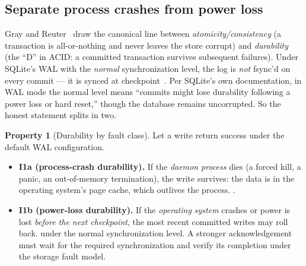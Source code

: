 \documentclass[11pt,a4paper]{article}
\theoremstyle{definition}
\newtheorem{property}{Property}[section]
\theoremstyle{remark}
\begin{document}
\subsection{Separate process crashes from power loss}
Gray and Reuter~ draw the canonical line between
\emph{atomicity/consistency} (a transaction is all-or-nothing and never leaves the
store corrupt) and \emph{durability} (the ``D'' in ACID: a committed transaction
survives subsequent failures). Under SQLite's WAL with the \emph{normal}
synchronization level, the log is \emph{not} fsync'd on every commit --- it is
synced at checkpoint~. Per SQLite's own documentation, in WAL mode
the normal level means ``commits might lose durability following a power loss or
hard reset,'' though the database remains uncorrupted. So the honest statement
splits in two.
\begin{property}[Durability by fault class]\label{prop:durability}
\setlength{\parskip}{4pt plus 1pt}
Let a write return success under the default WAL configuration.
\begin{itemize}[leftmargin=1.4em]
  \item \textbf{I1a (process-crash durability).} If the \emph{daemon process}
  dies (a forced kill, a panic, an out-of-memory termination), the write survives:
  the data is in the operating system's page cache, which outlives the process.
  \Built.
  \item \textbf{I1b (power-loss durability).} If the \emph{operating system}
  crashes or power is lost \emph{before the next checkpoint}, the most recent
  committed writes may roll back. \NotGuar{} under the normal synchronization
  level. A stronger acknowledgement must wait for the required synchronization
  and verify its completion under the storage fault model.
\end{itemize}
\end{property}
\end{document}
